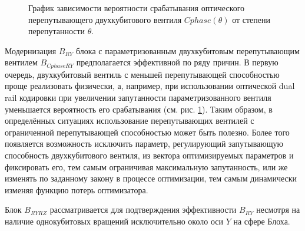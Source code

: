 \documentclass[14pt]{extarticle}
\begin{document}
\begin{figure}[H]
\caption{График зависимости вероятности срабатывания оптического перепутывающего двухкубитового вентиля $Cphase(\theta)$ от степени перепутанности $\theta$.} \label{fig:cphase_prob}
\end{figure}

\qquad Модернизация $B_{RY}$ блока с параметризованным двухкубитовым перепутывающим вентилем $B_{Cphase RY}$ предполагается эффективной по ряду причин. В первую очередь, двухкубитовый вентиль с меньшей перепутывающей способностью проще реализовать физически, а, например, при использовании оптической dual rail кодировки при увеличении запутанности параметризованного вентиля уменьшается вероятность его срабатывания (см. рис. \ref{fig:cphase_prob}). Таким образом, в определённых ситуациях использование перепутывающих вентилей с ограниченной перепутывающей способностью может быть полезно. Более того появляется возможность исключить параметр, регулирующий запутывающую способность двухкубитового вентиля, из вектора оптимизируемых параметров и фиксировать его, тем самым ограничивая максимальную запутанность, или же изменять по заданному закону в процессе оптимизации, тем самым динамически изменяя функцию потерь оптимизатора. 

\qquad Блок $B_{RY RZ}$ рассматривается для подтверждения эффективности $B_{RY}$ несмотря на наличие однокубитовых вращений исключительно около оси $Y$ на сфере Блоха.
\end{document}
